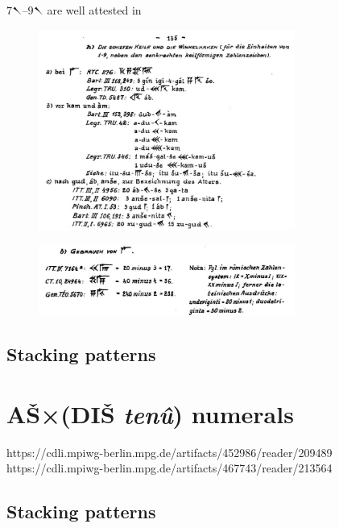 \documentclass[10pt, a4paper, twoside]{article}
\begin{document}
$7${\xsuxfont 𒀹}--$9${\xsuxfont 𒀹} are well attested in 

\begin{figure}
  \includegraphics[width=0.75\textwidth]{kwu-p-135.png}
  \caption{\cite[135]{KWU} \label{fig-KWU-135}}
\end{figure}

\begin{figure}
  \includegraphics[width=0.75\textwidth]{kwu-p-132.png}
  \caption{\cite[132]{KWU} \label{fig-KWU-132}}
\end{figure}

\subsection{Stacking patterns}

\section{AŠ×(DIŠ \emph{tenû}) numerals}

https://cdli.mpiwg-berlin.mpg.de/artifacts/452986/reader/209489
https://cdli.mpiwg-berlin.mpg.de/artifacts/467743/reader/213564

\subsection{Stacking patterns}
\end{document}
